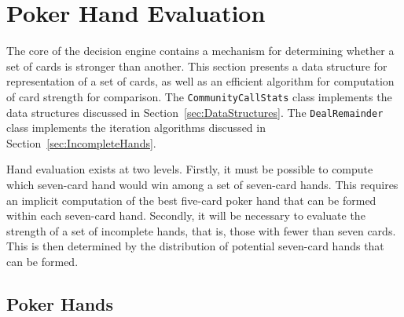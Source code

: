 
\newcommand{\xs}{$\spadesuit$}
\newcommand{\xh}{$\heartsuit$}
\newcommand{\xc}{$\clubsuit$}
\newcommand{\xd}{$\diamondsuit$}



\clearpage


\chapter{Poker Hand Evaluation}
\label{sec:HandEvaluation}

The core of the decision engine contains a mechanism for determining whether a set of cards is stronger than another.
This section presents a data structure for representation of a set of cards, as well as an efficient algorithm for computation of card strength for comparison.
The \texttt{CommunityCallStats} class implements the data structures discussed in Section~\ref{sec:DataStructures}.
The \texttt{DealRemainder} class implements the iteration algorithms discussed in Section~\ref{sec:IncompleteHands}.





Hand evaluation exists at two levels.
Firstly, it must be possible to compute which seven-card hand would win among a set of seven-card hands.
This requires an implicit computation of the best five-card poker hand that can be formed within each seven-card hand.
Secondly, it will be necessary to evaluate the strength of a set of incomplete hands, that is, those with fewer than seven cards.
This is then determined by the distribution of potential seven-card hands that can be formed.


\section{Poker Hands}
\label{sec:PokerHands}


